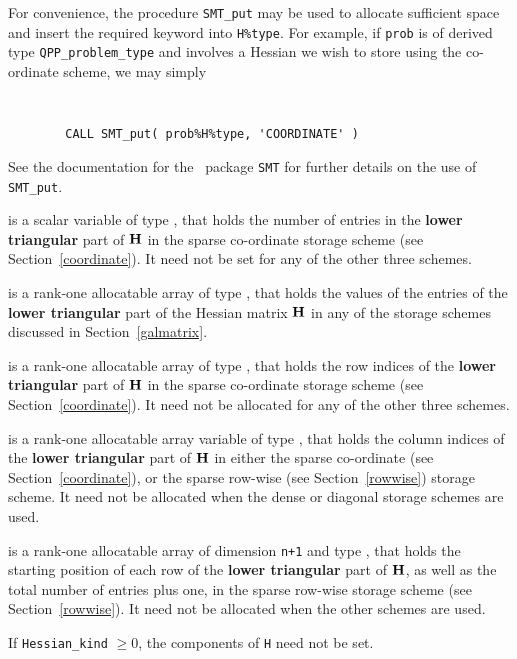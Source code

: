 \documentclass{galahad}
\newcommand{\packagename}{QPP}
\begin{document}
\begin{description}
\begin{description}
For convenience, the procedure {\tt SMT\_put} 
may be used to allocate sufficient space and insert the required keyword
into {\tt H\%type}.
For example, if {\tt prob} is of derived type {\tt \packagename\_problem\_type}
and involves a Hessian we wish to store using the co-ordinate scheme,
we may simply
{\tt 
\begin{verbatim}
        CALL SMT_put( prob%H%type, 'COORDINATE' )
\end{verbatim}
}
\noindent
See the documentation for the \galahad\ package {\tt SMT} 
for further details on the use of {\tt SMT\_put}.

 is a scalar variable of type \integer, that 
holds the number of entries in the {\bf lower triangular} part of ${\mathbf{H}}$
in the sparse co-ordinate storage scheme (see Section~\ref{coordinate}). 
It need not be set for any of the other three schemes.

 is a rank-one allocatable array of type \realdp, that holds
the values of the entries of the {\bf lower triangular} part
of the Hessian matrix ${\mathbf{H}}$ in any of the 
storage schemes discussed in Section~\ref{galmatrix}.

 is a rank-one allocatable array of type \integer,
that holds the row indices of the {\bf lower triangular} part of ${\mathbf{H}}$ 
in the sparse co-ordinate storage
scheme (see Section~\ref{coordinate}). 
It need not be allocated for any of the other three schemes.

 is a rank-one allocatable array variable of type \integer,
that holds the column indices of the {\bf lower triangular} part of 
${\mathbf{H}}$ in either the sparse co-ordinate 
(see Section~\ref{coordinate}), or the sparse row-wise 
(see Section~\ref{rowwise}) storage scheme.
It need not be allocated when the dense or diagonal storage schemes are used.

 is a rank-one allocatable array of dimension {\tt n+1} and type 
\integer, that holds the starting position of 
each row of the {\bf lower triangular} part of ${\mathbf{H}}$, as well
as the total number of entries plus one, in the sparse row-wise storage
scheme (see Section~\ref{rowwise}). It need not be allocated when the
other schemes are used.

\end{description}
If {\tt Hessian\_kind} $\geq 0$, the components of {\tt H} need not be set.


\end{description}
\end{document}
